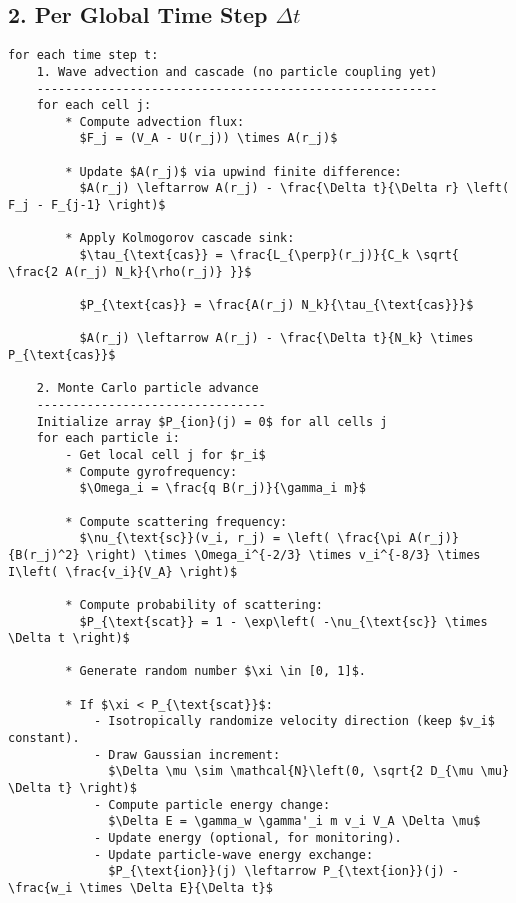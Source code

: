 \hrulefill

\subsection*{2. \textbf{Per Global Time Step $\Delta t$}}

\begin{lstlisting}[language={}, mathescape=true]
for each time step t:
    1. Wave advection and cascade (no particle coupling yet)
    --------------------------------------------------------
    for each cell j:
        * Compute advection flux:
          $F_j = (V_A - U(r_j)) \times A(r_j)$
        
        * Update $A(r_j)$ via upwind finite difference:
          $A(r_j) \leftarrow A(r_j) - \frac{\Delta t}{\Delta r} \left( F_j - F_{j-1} \right)$
        
        * Apply Kolmogorov cascade sink:
          $\tau_{\text{cas}} = \frac{L_{\perp}(r_j)}{C_k \sqrt{ \frac{2 A(r_j) N_k}{\rho(r_j)} }}$
          
          $P_{\text{cas}} = \frac{A(r_j) N_k}{\tau_{\text{cas}}}$
          
          $A(r_j) \leftarrow A(r_j) - \frac{\Delta t}{N_k} \times P_{\text{cas}}$

    2. Monte Carlo particle advance
    --------------------------------
    Initialize array $P_{ion}(j) = 0$ for all cells j
    for each particle i:
        - Get local cell j for $r_i$
        * Compute gyrofrequency:
          $\Omega_i = \frac{q B(r_j)}{\gamma_i m}$
        
        * Compute scattering frequency:
          $\nu_{\text{sc}}(v_i, r_j) = \left( \frac{\pi A(r_j)}{B(r_j)^2} \right) \times \Omega_i^{-2/3} \times v_i^{-8/3} \times I\left( \frac{v_i}{V_A} \right)$
        
        * Compute probability of scattering:
          $P_{\text{scat}} = 1 - \exp\left( -\nu_{\text{sc}} \times \Delta t \right)$
        
        * Generate random number $\xi \in [0, 1]$.
        
        * If $\xi < P_{\text{scat}}$:
            - Isotropically randomize velocity direction (keep $v_i$ constant).
            - Draw Gaussian increment:
              $\Delta \mu \sim \mathcal{N}\left(0, \sqrt{2 D_{\mu \mu} \Delta t} \right)$
            - Compute particle energy change:
              $\Delta E = \gamma_w \gamma'_i m v_i V_A \Delta \mu$
            - Update energy (optional, for monitoring).
            - Update particle-wave energy exchange:
              $P_{\text{ion}}(j) \leftarrow P_{\text{ion}}(j) - \frac{w_i \times \Delta E}{\Delta t}$
        

\end{lstlisting}
